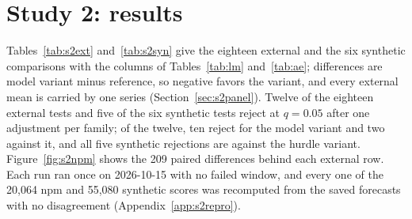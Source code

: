 \providecommand{\lm}{\texttt{local\_mean\_28}}
\providecommand{\aets}{\texttt{autoets\_weekly}}
\providecommand{\qs}{QScore9}
\providecommand{\hc}{\texttt{hurdle\_count\_28}}

\section{Study 2: results}
\label{sec:s2results}

Tables~\ref{tab:s2ext} and~\ref{tab:s2syn} give the eighteen external and the six synthetic comparisons
with the columns of Tables~\ref{tab:lm} and~\ref{tab:ae}; differences are model variant minus reference, so
negative favors the variant, and every external mean is carried by one series (Section~\ref{sec:s2panel}).
Twelve of the eighteen external tests and five of the six synthetic tests reject at $q = 0.05$ after one
adjustment per family; of the twelve, ten reject for the model variant and two against it, and all five
synthetic rejections are against the hurdle variant. Figure~\ref{fig:s2npm} shows the 209 paired differences
behind each external row. Each run ran once on 2026-10-15 with no failed window, and every one of the 20,064
npm and 55,080 synthetic scores was recomputed from the saved forecasts with no disagreement
(Appendix~\ref{app:s2repro}).

